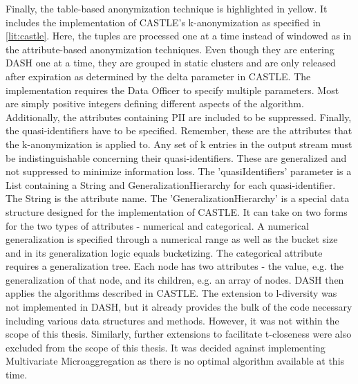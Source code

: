 Finally, the table-based anonymization technique is highlighted in yellow. It includes the implementation of CASTLE's k-anonymization as specified in \ref{lit:castle}. Here, the tuples are processed one at a time instead of windowed as in the attribute-based anonymization techniques. Even though they are entering \ac{DASH} one at a time, they are grouped in static clusters and are only released after expiration as determined by the delta parameter in CASTLE. The implementation requires the Data Officer to specify multiple parameters. Most are simply positive integers defining different aspects of the algorithm. Additionally, the attributes containing \ac{PII} are included to be suppressed. Finally, the quasi-identifiers have to be specified. Remember, these are the attributes that the k-anonymization is applied to. Any set of k entries in the output stream must be indistinguishable concerning their quasi-identifiers. These are generalized and not suppressed to minimize information loss. The 'quasiIdentifiers' parameter is a List containing a String and GeneralizationHierarchy for each quasi-identifier. The String is the attribute name. The 'GeneralizationHierarchy' is a special data structure designed for the implementation of CASTLE. It can take on two forms for the two types of attributes - numerical and categorical. A numerical generalization is specified through a numerical range as well as the bucket size and in its generalization logic equals bucketizing. The categorical attribute requires a generalization tree. Each node has two attributes - the value, e.g. the generalization of that node, and its children, e.g. an array of nodes. \ac{DASH} then applies the algorithms described in CASTLE. The extension to l-diversity was not implemented in \ac{DASH}, but it already provides the bulk of the code necessary including various data structures and methods. However, it was not within the scope of this thesis. Similarly, further extensions to facilitate t-closeness were also excluded from the scope of this thesis. It was decided against implementing Multivariate Microaggregation as there is no optimal algorithm available at this time. 

